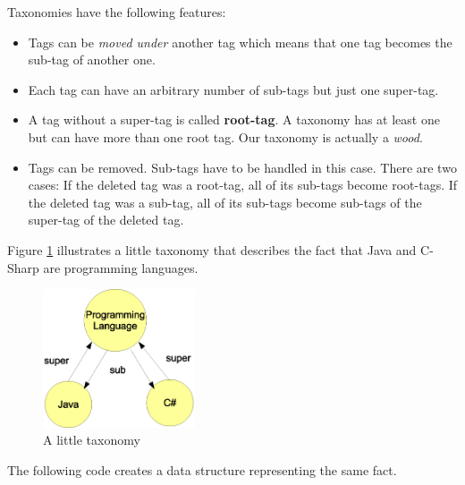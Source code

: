 Taxonomies have the following features:

\begin{itemize}
    \item 
Tags can be {\it moved under} another tag which means that one tag becomes the sub-tag of another one.

    \item 
Each tag can have an arbitrary number of sub-tags but just one super-tag.

    \item 
A tag without a super-tag is called {\bf root-tag}. A taxonomy has at least one but can have more than one root tag. Our taxonomy is actually a {\it wood}.

    \item 
Tags can be removed. Sub-tags have to be handled in this case. There are two cases: If the deleted tag was a root-tag, all of its sub-tags become root-tags. If the deleted tag was a sub-tag, all of its sub-tags become sub-tags of the super-tag of the deleted tag.

\end{itemize}

Figure \ref{fig:taxonomy} illustrates a little taxonomy that describes the fact that Java and C-Sharp are programming languages.

\begin{figure}[t]
\centering
\includegraphics[width=0.40\textwidth]{taxonomy.eps}
\caption{A little taxonomy}
\label{fig:taxonomy}
\end{figure}

The following code creates a data structure representing the same fact.

